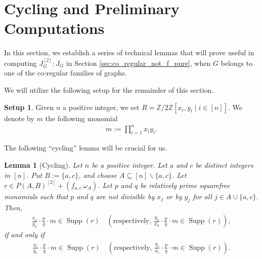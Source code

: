 \documentclass[12pt,a4paper]{amsart}
\theoremstyle{plain}
\newtheorem{lem}[thrm]{Lemma}
\def\blem{\begin{lem}}
\def\elem{\end{lem}}
\theoremstyle{definition}
\newtheorem{setup}[thrm]{Setup}
\theoremstyle{remark}
\let\setminus=\smallsetminus
\def\Z{\mathbb{Z}}
\DeclareMathOperator{\Supp}{Supp}
\renewcommand{\subset}{\subseteq}
\begin{document}
\section{Cycling and Preliminary Computations}
\label{sec:cycling}

In this section, we establish a series of technical lemmas that will prove useful in computing $J_{G}^{[2]}:J_{G}$ in Section \ref{sec:co_regular_not_f_pure}, when $G$ belongs to one of the co-regular families of graphs.

We will utilize the following setup for the remainder of this section.
\begin{setup}
Given $n$ a positive integer, we set $R = \Z/2\Z[x_{i},y_{i} \mid i \in [n]]$. We denote by $m$ the following monomial
\begin{align*}
    m := \prod_{i=1}^{n} x_{i}y_{i}.
\end{align*}
\end{setup}

The following ``cycling'' lemma will be crucial for us.

\blem[Cycling]
\label{lem:cycling}
Let $n$ be a positive integer. Let $a$ and $c$ be distinct integers in $[n]$. Put $B := \{a,c\}$, and choose $A \subset [n] \setminus \{a,c\}$. Let $r \in P(A,B)^{[2]} + (f_{a,c} \, \omega_{A})$. Let $p$ and $q$ be relatively prime squarefree monomials such that $p$ and $q$ are not divisible by $x_{j}$ or by $y_{j}$ for all $j \in A \cup \{a,c\}$. Then,
\begin{align*}
\frac{x_{a}}{y_{a}} \cdot \frac{p}{q} \cdot m \in \Supp(r) \quad (\text{respectively, } \frac{y_{a}}{x_{a}} \cdot \frac{p}{q} \cdot m \in \Supp(r)),
\end{align*}
if and only if 
\begin{align*}
\frac{x_{c}}{y_{c}} \cdot \frac{p}{q} \cdot m \in \Supp(r) \quad (\text{respectively, } \frac{y_{c}}{x_{c}} \cdot \frac{p}{q} \cdot m \in \Supp(r)).
\end{align*}
\elem 
\end{document}
